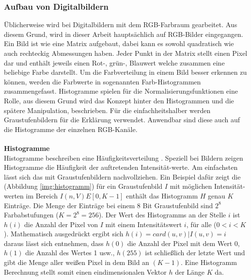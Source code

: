 \documentclass[a4paper,12pt,oneside]{article}
\begin{document}
    \subsubsection{Aufbau von Digitalbildern}\label{s.aufbdigibilder}
  Üblicherweise wird bei Digitalbildern mit dem RGB-Farbraum gearbeitet. Aus diesem Grund, wird in dieser Arbeit hauptsächlich auf RGB-Bilder eingegangen. Ein Bild ist wie eine Matrix aufgebaut, dabei kann es sowohl quadratisch wie auch rechteckig Abmessungen haben. Jeder Punkt in der Matrix stellt einen Pixel dar und enthält jeweils einen Rot-, grün-, Blauwert welche zusammen eine beliebige Farbe darstellt. Um die Farbverteilung in einem Bild besser erkennen zu können, werden die Farbwerte in sogenannten Farb-Histogrammen zusammengefasst. Histogramme spielen für die Normalisierungsfunktionen eine Rolle, aus diesem Grund wird das Konzept hinter den Histogrammen und die spätere Manipulation, beschrieben. Für die einfachheitshalber werden Graustufenbildern für die Erklärung verwendet. Anwendbar sind diese auch auf die Histogramme der einzelnen RGB-Kanäle.\\\\
  \textbf{Histogramme}\label{s.histogramme}\\
  Histogramme beschreiben eine Häufigkeitsverteilung \cite[42ff.]{burger2009digitale}. Speziell bei Bildern zeigen Histogramme die Häufigkeit der auftretenden Intensität-werte. Am einfachsten lässt sich das mit Graustufenbildern nachvollziehen. Ein Beispiel dafür zeigt die (Abbildung \ref{img:histogramm}) für ein Graustufenbild $I$ mit möglichen Intensität-werten im Bereich $I(n,V)E[0,K-1]$ enthält das Histogramm $H$ genau $K$ Einträge. Die Menge der Einträge bei einem 8 Bit Graustufenbild sind $2^8$ Farbabstufungen ($K=2^8=256$). Der Wert des Histogramms an der Stelle $i$ ist $h(i)$ die Anzahl der Pixel von $I$ mit einem Intensitätswert $i$, für alle ($0<i<K$). Mathematisch ausgedrückt ergibt sich $h(i)=card{(u,v) | I(u,v)=i}$\\
  daraus lässt sich entnehmen, dass $h(0)$ die Anzahl der Pixel mit dem Wert 0, $h(1)$ die Anzahl des Wertes 1 usw., $h(255)$ ist schließlich der letzte Wert und gibt die Menge aller weißen Pixel in dem Bild an $(K-1)$. Eine Histogramm Berechnung stellt somit einen eindimensionalen Vektor $h$ der Länge $K$ da.\\
\end{document}
